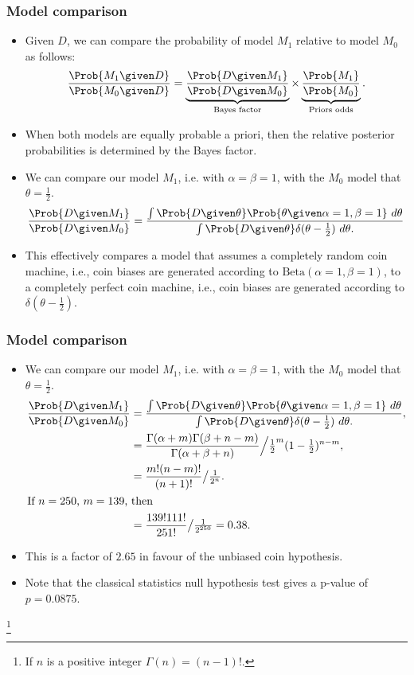 \documentclass{slides}
\begin{document}
\begin{frame}
	\frametitle{Model comparison}
	\begin{itemize}
		\item Given $D$, we can compare the probability of model $M_1$ relative to model $M_0$ as follows:
			\begin{align*}
				\frac{\Prob{M_1\given D}}{\Prob{M_0\given D}} = 
				\underbrace{\frac{\Prob{D\given M_1}}{\Prob{D\given M_0}}}_{\text{Bayes factor}} \times
				\underbrace{\frac{\Prob{M_1}}{\Prob{M_0}}}_{\text{Priors odds}}. 
			\end{align*}
		\item When both models are equally probable a priori, then the relative posterior probabilities is determined by the Bayes factor.
		\item We can compare our model $M_1$, i.e. with $\alpha = \beta = 1$, with the $M_0$ model that $\theta = \frac{1}{2}$.
			\begin{align*}
				\frac{\Prob{D\given M_1}}{\Prob{D\given M_0}} = \frac{
				\int\Prob{D\given\theta}\Prob{\theta\given\alpha=1,\beta=1}\ d\theta 
				}{
					\int\Prob{D\given\theta} \delta(\theta-\frac{1}{2})\ d\theta.
				}
			\end{align*}

		\item This effectively compares a model that assumes a
			completely random coin machine, i.e., coin biases are
			generated according to $\textrm{Beta}(\alpha=1,
			\beta=1)$, to a completely perfect coin machine, i.e.,
			coin biases are generated according to
			$\delta(\theta-\frac{1}{2})$.  \end{itemize}

	\end{frame} 
	
\begin{frame}
	\frametitle{Model comparison}
	\begin{itemize}
		\item We can compare our model $M_1$, i.e. with $\alpha = \beta = 1$, with the $M_0$ model that $\theta = \frac{1}{2}$.
			\begin{align*}
				\frac{\Prob{D\given M_1}}{\Prob{D\given M_0}} &= \frac{
				\int\Prob{D\given\theta}\Prob{\theta\given\alpha=1,\beta=1}\ d\theta 
				}{
					\int\Prob{D\given\theta} \delta(\theta-\frac{1}{2})\ d\theta.
				},\\
				&= \frac{\Gamma(\alpha+m)\Gamma(\beta+n-m)}{\Gamma(\alpha+\beta+n)} \Big/ \tfrac{1}{2}^m (1-\tfrac{1}{2})^{n-m},\\
				&= \frac{m!(n-m)!}{(n+1)!} \big/ \tfrac{1}{2^n}.\\
				\intertext{If $n=250$, $m=139$, then}
				&= \frac{139!111!}{251!} \big/ \tfrac{1}{2^{250}} = 0.38.
			\end{align*}
		\item This is a factor of $2.65$ in favour of the unbiased coin hypothesis.
		\item Note that the classical statistics null hypothesis test gives a p-value of $p=0.0875$.
	\end{itemize}
	\let\thefootnote\relax\footnote{If $n$ is a positive integer $\Gamma(n) = (n-1)!$.}
	\end{frame}
\end{document}
